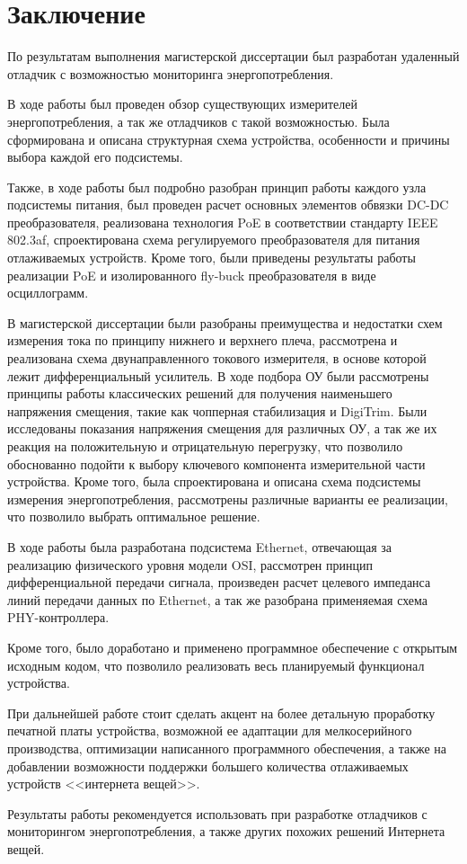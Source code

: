 \chapter*{Заключение}
\hspace{1cm}

По результатам выполнения магистерской диссертации был разработан удаленный отладчик с возможностью 
мониторинга энергопотребления.

В ходе работы был проведен обзор существующих измерителей энергопотребления, а так же отладчиков с 
такой возможностью. Была сформирована и описана структурная схема устройства, особенности и 
причины выбора каждой его подсистемы. 

Также, в ходе работы был подробно разобран принцип работы каждого узла подсистемы питания, 
был проведен расчет основных элементов обвязки DC-DC преобразователя, реализована технология PoE 
в соответствии стандарту  IEEE 802.3af, спроектирована схема регулируемого преобразователя для 
питания отлаживаемых устройств. Кроме того, были приведены результаты работы реализации PoE и 
изолированного fly-buck преобразователя в виде осциллограмм. 

В магистерской диссертации были разобраны преимущества и недостатки схем измерения тока по принципу 
нижнего и верхнего плеча, рассмотрена и реализована схема двунаправленного токового измерителя, в основе 
которой лежит дифференциальный усилитель. В ходе подбора ОУ были рассмотрены принципы работы
классических решений для получения наименьшего напряжения смещения, такие как чопперная стабилизация
и DigiTrim. Были исследованы показания напряжения смещения для различных ОУ, а так же их реакция на 
положительную и отрицательную перегрузку, что позволило обоснованно подойти к выбору ключевого 
компонента измерительной части устройства. Кроме того, была спроектирована и описана схема подсистемы 
измерения энергопотребления, рассмотрены различные варианты ее реализации, что позволило выбрать 
оптимальное решение. 

В ходе работы была разработана подсистема Ethernet, отвечающая за реализацию физического уровня 
модели OSI, рассмотрен принцип дифференциальной передачи сигнала, произведен расчет целевого 
импеданса линий передачи данных по Ethernet, а так же разобрана применяемая схема PHY-контроллера. 

Кроме того, было доработано и применено программное обеспечение с открытым исходным кодом, что 
позволило реализовать весь планируемый функционал устройства. 

При дальнейшей работе стоит сделать акцент на более детальную проработку печатной платы устройства, 
возможной ее адаптации для мелкосерийного производства, оптимизации написанного программного 
обеспечения, а также на добавлении возможности поддержки большего количества отлаживаемых устройств 
<<интернета вещей>>. 

Результаты работы рекомендуется использовать при разработке отладчиков с мониторингом энергопотребления, 
а также других похожих решений Интернета вещей.